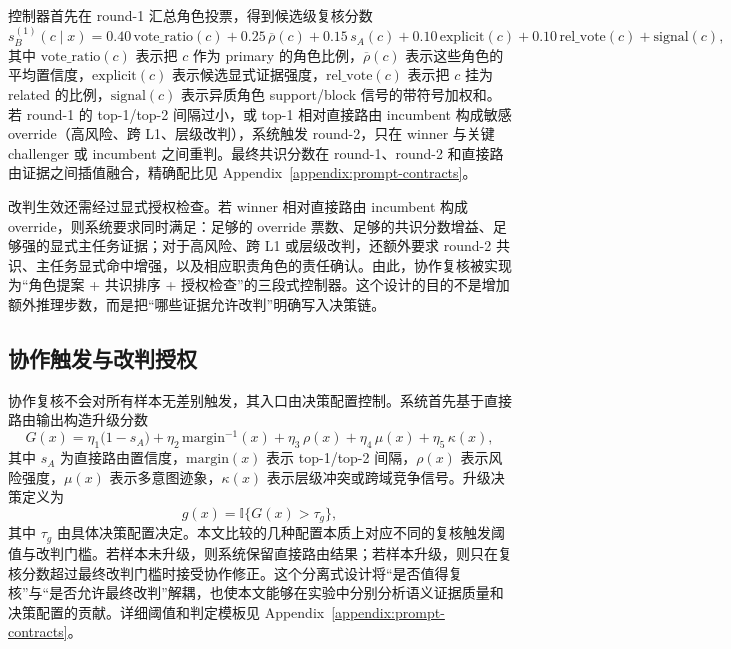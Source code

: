 \documentclass[11pt,a4paper]{ctexart}
\begin{document}
控制器首先在 round-1 汇总角色投票，得到候选级复核分数
\begin{equation}
\label{eq:round1-consensus}
s_B^{(1)}(c\mid x)=
0.40\,\mathrm{vote\_ratio}(c)
+0.25\,\overline{\rho}(c)
+0.15\,s_A(c)
+0.10\,\mathrm{explicit}(c)
+0.10\,\mathrm{rel\_vote}(c)
+\mathrm{signal}(c),
\end{equation}
其中 $\mathrm{vote\_ratio}(c)$ 表示把 $c$ 作为 primary 的角色比例，$\overline{\rho}(c)$ 表示这些角色的平均置信度，$\mathrm{explicit}(c)$ 表示候选显式证据强度，$\mathrm{rel\_vote}(c)$ 表示把 $c$ 挂为 related 的比例，$\mathrm{signal}(c)$ 表示异质角色 support/block 信号的带符号加权和。若 round-1 的 top-1/top-2 间隔过小，或 top-1 相对直接路由 incumbent 构成敏感 override（高风险、跨 L1、层级改判），系统触发 round-2，只在 winner 与关键 challenger 或 incumbent 之间重判。最终共识分数在 round-1、round-2 和直接路由证据之间插值融合，精确配比见 Appendix~\ref{appendix:prompt-contracts}。

改判生效还需经过显式授权检查。若 winner 相对直接路由 incumbent 构成 override，则系统要求同时满足：足够的 override 票数、足够的共识分数增益、足够强的显式主任务证据；对于高风险、跨 L1 或层级改判，还额外要求 round-2 共识、主任务显式命中增强，以及相应职责角色的责任确认。由此，协作复核被实现为“角色提案 + 共识排序 + 授权检查”的三段式控制器。这个设计的目的不是增加额外推理步数，而是把“哪些证据允许改判”明确写入决策链。

\subsection{协作触发与改判授权}

协作复核不会对所有样本无差别触发，其入口由决策配置控制。系统首先基于直接路由输出构造升级分数
\begin{equation}
G(x)=\eta_1\bigl(1-s_A\bigr)+\eta_2 \,\mathrm{margin}^{-1}(x)+\eta_3 \,\rho(x)+\eta_4 \,\mu(x)+\eta_5 \,\kappa(x),
\end{equation}
其中 $s_A$ 为直接路由置信度，$\mathrm{margin}(x)$ 表示 top-1/top-2 间隔，$\rho(x)$ 表示风险强度，$\mu(x)$ 表示多意图迹象，$\kappa(x)$ 表示层级冲突或跨域竞争信号。升级决策定义为
\begin{equation}
g(x)=\mathbb{I}\{G(x)>\tau_g\},
\end{equation}
其中 $\tau_g$ 由具体决策配置决定。本文比较的几种配置本质上对应不同的复核触发阈值与改判门槛。若样本未升级，则系统保留直接路由结果；若样本升级，则只在复核分数超过最终改判门槛时接受协作修正。这个分离式设计将“是否值得复核”与“是否允许最终改判”解耦，也使本文能够在实验中分别分析语义证据质量和决策配置的贡献。详细阈值和判定模板见 Appendix~\ref{appendix:prompt-contracts}。
\end{document}
